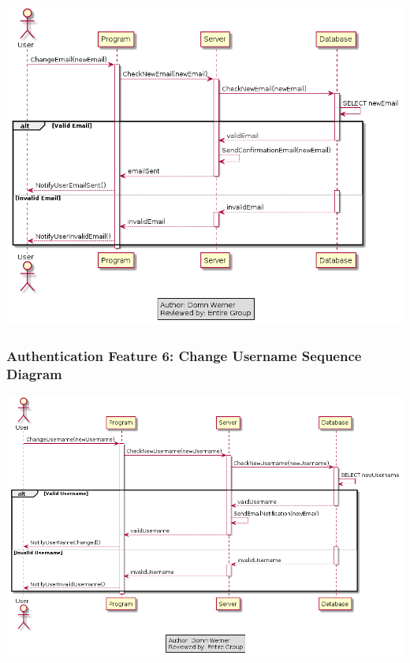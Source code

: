 \documentclass[twoside,letterpaper]{article}
\begin{document}
	\includegraphics[width=6.0in]{images/SequenceDiagrams/AuthenticationChangeEmail}
	
	\newpage
	
	
	\subsubsection[Authentication Feature 6: Change Username Sequence Diagram]{\rmfamily\bfseries\color{black}
		Authentication Feature 6: Change Username Sequence Diagram}
		\label{a:sd6}
	\hypertarget{RefHeading22059017292}{}
	
	\bigskip
	
	\includegraphics[width=6.0in]{images/SequenceDiagrams/AuthenticationChangeUsername}
	
\end{document}
